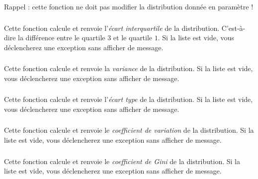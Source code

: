 \medskip

\noindent Rappel : cette fonction ne doit pas modifier la distribution donnée en paramètre !



\subsubsection*{}

\noindent Cette fonction calcule et renvoie l'\textit{écart interquartile} de la distribution.
C'est-à-dire la différence entre le quartile $ 3 $ et le quartile $ 1 $.
Si la liste est vide, vous déclencherez une exception  sans afficher de message.


\subsubsection*{}

\noindent Cette fonction calcule et renvoie la \textit{variance} de la distribution.
Si la liste est vide, vous déclencherez une exception  sans afficher de message.


\subsubsection*{}

\noindent Cette fonction calcule et renvoie l'\textit{écart type} de la distribution.
Si la liste est vide, vous déclencherez une exception  sans afficher de message.


\subsubsection*{}

\noindent Cette fonction calcule et renvoie le \textit{coefficient de variation} de la distribution.
Si la liste est vide, vous déclencherez une exception  sans afficher de message.


\subsubsection*{}

\noindent Cette fonction calcule et renvoie le \textit{coefficient de Gini} de la distribution.
Si la liste est vide, vous déclencherez une exception  sans afficher de message.
